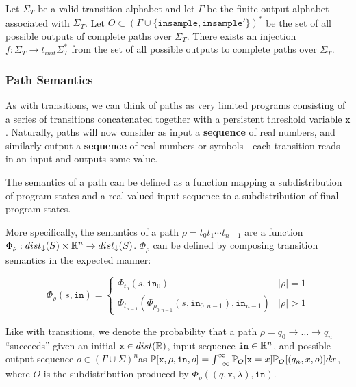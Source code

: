 \begin{prop}
    Let $\Sigma_T$ be a valid transition alphabet and let $\Gamma$ be the finite output alphabet associated with $\Sigma_T$. Let $O\subset (\Gamma\cup\{\texttt{insample}, \texttt{insample}'\})^*$ be the set of all possible outputs of complete paths over $\Sigma_T$. There exists an injection $f: \Sigma_T\to t_{init}\Sigma_T^*$ from the set of all possible outputs to complete paths over $\Sigma_T$. 
\end{prop}

\subsubsection{Path Semantics}

As with transitions, we can think of paths as very limited programs consisting of a series of transitions concatenated together with a persistent threshold variable $\texttt{x}$. Naturally, paths will now consider as input a \textbf{sequence} of real numbers, and similarly output a \textbf{sequence} of real numbers or symbols - each transition reads in an input and outputs some value.

The semantics of a path can be defined as a function mapping a subdistribution of program states and a real-valued input sequence to a subdistribution of final program states. 

More specifically, the semantics of a path $\rho = t_0t_1\cdots t_{n-1}$ are a function $\Phi_\rho: dist_\downarrow(S)\times \mathbb{R}^n \to dist_\downarrow(S)$. $\Phi_\rho$ can be defined by composing transition semantics in the expected manner:

\[\Phi_\rho(s, \texttt{in}) = \begin{cases}
    \Phi_{t_0}(s, \texttt{in}_0)& |\rho| = 1\\
    \Phi_{t_{n-1}}(\Phi_{\rho_{0:n-1}}(s, \texttt{in}_{0:n-1}), \texttt{in}_{n-1})& |\rho| >1
\end{cases}\]

Like with transitions, we denote the probability that a path $\rho = q_0\to\ldots\to q_n$ ``succeeds'' given an initial $\texttt{x}\in dist(\mathbb{R})$, input sequence $\texttt{in} \in \mathbb{R}^n$, and possible output sequence $o \in (\Gamma\cup\Sigma)^n$as $\mathbb{P}[\texttt{x}, \rho, \texttt{in}, o] = \int_{-\infty}^\infty\mathbb{P}_O[\texttt{x} =x]\mathbb{P}_O[(q_{n}, x, o)]dx$, where $O$ is the subdistribution produced by $\Phi_\rho((q, \texttt{x}, \lambda), \texttt{in})$.

